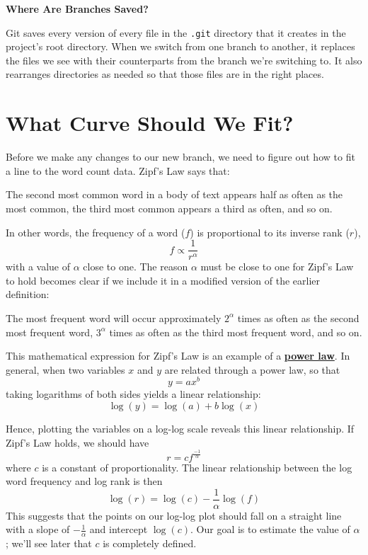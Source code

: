 \documentclass[
]{krantz}
\renewenvironment{quote}{\begin{VF}}{\end{VF}}
\newcommand{\gref}[2]{\hyperlink{#2}{\textbf{#1}}}
\begin{document}
\begin{quote}
\textbf{Where Are Branches Saved?}

Git saves every version of every file in the \texttt{.git} directory
that it creates in the project's root directory.
When we switch from one branch to another,
it replaces the files we see with
their counterparts from the branch we're switching to.
It also rearranges directories as needed
so that those files are in the right places.
\end{quote}

\hypertarget{git-advanced-theory}{%
\section{What Curve Should We Fit?}\label{git-advanced-theory}}

Before we make any changes to our new branch,
we need to figure out how to fit a line to the word count data.
Zipf's Law says that:

\begin{quote}
The second most common word in a body of text
appears half as often as the most common,
the third most common appears a third as often, and so on.
\end{quote}

In other words,
the frequency of a word (\(f\)) is proportional to its inverse rank (\(r\)), \[
f \propto \frac{1}{r^\alpha}
\]
with a value of \(\alpha\) close to one.
The reason \(\alpha\) must be close to one for Zipf's Law to hold
becomes clear if we include it in a modified version of the earlier definition:

\begin{quote}
The most frequent word will occur approximately \(2^\alpha\) times
as often as the second most frequent word,
\(3^\alpha\) times as often as the third most frequent word, and so on.
\end{quote}

This mathematical expression for Zipf's Law is an example of a \gref{power law}{power\_law}.
In general, when two variables \(x\) and \(y\)
are related through a power law, so that \[
y = ax^b
\]
taking logarithms of both sides yields a linear relationship: \[
\log(y) = \log(a) + b\log(x)
\]

Hence,
plotting the variables on a log-log scale reveals this linear relationship.
If Zipf's Law holds,
we should have \[
r = cf^{\frac{-1}{\alpha}}
\]
where \(c\) is a constant of proportionality.
The linear relationship between the log word frequency and
log rank is then \[
\log(r) = \log(c) - \frac{1}{\alpha}\log(f)
\]
This suggests that the points on our log-log plot should fall on a straight line
with a slope of \(- \tfrac{1}{\alpha}\)
and intercept \(\log(c)\).
Our goal is to estimate the value of \(\alpha\);
we'll see later that \(c\) is completely defined.
\end{document}
